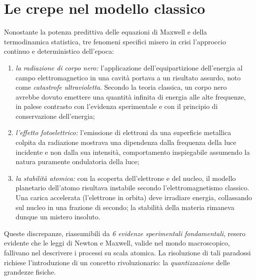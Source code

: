 \documentclass[a4paper,11pt]{report}
\begin{document}
\section{Le crepe nel modello classico}
Nonostante la potenza predittiva delle equazioni di Maxwell e della termodinamica statistica, tre fenomeni specifici misero in crisi l'approccio continuo e deterministico dell'epoca:

\begin{enumerate}
    \item \textit{la radiazione di corpo nero:} l'applicazione dell'equipartizione dell'energia al campo elettromagnetico in una cavità portava a un risultato assurdo, noto come \textit{catastrofe ultravioletta}. Secondo la teoria classica, un corpo nero avrebbe dovuto emettere una quantità infinita di energia alle alte frequenze, in palese contrasto con l'evidenza sperimentale e con il principio di conservazione dell'energia;
    
    \item \textit{l'effetto fotoelettrico:} l'emissione di elettroni da una superficie metallica colpita da radiazione mostrava una dipendenza dalla frequenza della luce incidente e non dalla sua intensità, comportamento inspiegabile assumendo la natura puramente ondulatoria della luce;
    
    \item \textit{la stabilità atomica:} con la scoperta dell'elettrone e del nucleo, il modello planetario dell'atomo risultava instabile secondo l'elettromagnetismo classico. Una carica accelerata (l'elettrone in orbita) deve irradiare energia, collassando sul nucleo in una frazione di secondo; la stabilità della materia rimaneva dunque un mistero insoluto.
\end{enumerate}
Queste discrepanze, riassumibili da \textit{6 evidenze sperimentali fondamentali}, resero evidente che le leggi di Newton e Maxwell, valide nel mondo macroscopico, fallivano nel descrivere i processi su scala atomica. La risoluzione di tali paradossi richiese l'introduzione di un concetto rivoluzionario: la \textit{quantizzazione} delle grandezze fisiche.
\end{document}
